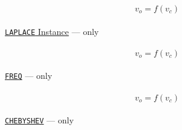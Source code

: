 \begin{equation}
v_o = f(v_c)
\end{equation}
\\[0.2in]\noindent\underline{{\tt LAPLACE} Instance} ---  only
\\[0.1in]\hspace*{\fill}\\[0.1in]
\begin{equation}
v_o = f(v_c)
\end{equation}
\\[0.2in]\noindent\underline{{\tt FREQ}} ---  only
\\[0.1in]\hspace*{\fill}
       \\[0.1in]
\begin{equation}
v_o = f(v_c)
\end{equation}
\\[0.2in]\noindent\underline{{\tt CHEBYSHEV}} ---  only
\\[0.1in]\hspace*{\fill}\\[0.1in]
